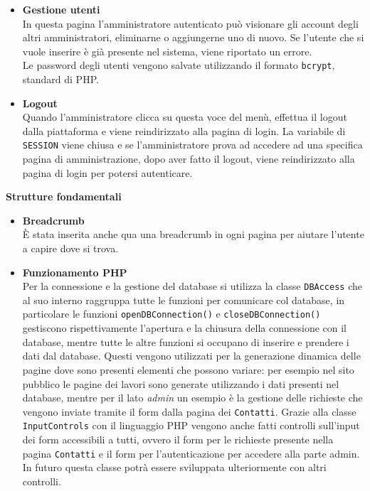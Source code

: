 \begin{itemize}
 	\item \textbf{Gestione utenti}\\In questa pagina l'amministratore autenticato può visionare gli account degli altri amministratori, eliminarne o aggiungerne uno di nuovo. Se l'utente che si vuole inserire è già presente nel sistema, viene riportato un errore.\\Le password degli utenti vengono salvate utilizzando il formato \texttt{bcrypt}, standard di PHP.
 	\item \textbf{Logout}\\Quando l'amministratore clicca su questa voce del menù, effettua il logout dalla piattaforma e viene reindirizzato alla pagina di login. La variabile di \texttt{SESSION} viene chiusa e se l'amministratore prova ad accedere ad una specifica pagina di amministrazione, dopo aver fatto il logout, viene reindirizzato alla pagina di login per potersi autenticare.\\ 
 	\end{itemize}
\textbf{Strutture fondamentali}
\begin{itemize}
	\item \textbf{Breadcrumb}\\	È stata inserita anche qua una breadcrumb in ogni pagina per aiutare l'utente a capire dove si trova. 
	\item \textbf{Funzionamento PHP}\\	Per la connessione e la gestione del database si utilizza la classe \texttt{DBAccess} che al suo interno raggruppa tutte le funzioni per comunicare col database, in particolare le funzioni \texttt{openDBConnection()} e \texttt{closeDBConnection()} gestiscono rispettivamente l'apertura e la chiusura della connessione con il database, mentre tutte le altre funzioni si occupano di inserire e prendere i dati dal database. Questi vengono utilizzati per la generazione dinamica delle pagine dove sono presenti elementi che possono variare: per esempio nel sito pubblico le pagine dei lavori sono generate utilizzando i dati presenti nel database, mentre per il lato \textit{admin} un esempio è la gestione delle richieste che vengono inviate tramite il form dalla pagina dei \texttt{Contatti}.
Grazie alla classe \texttt{InputControls} con il linguaggio PHP vengono anche fatti controlli sull'input dei form accessibili a tutti, ovvero il form per le richieste presente nella pagina \texttt{Contatti} e il form per l'autenticazione per accedere alla parte admin. In futuro questa classe potrà essere sviluppata ulteriormente con altri controlli. 
\end{itemize}
